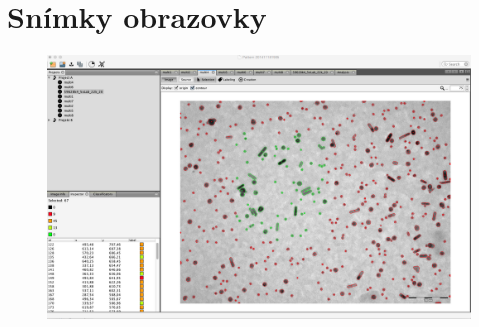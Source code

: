 \documentclass[11pt,twoside,a4paper,table]{book}
\begin{document}
\chapter{Snímky obrazovky}
\label{apend:screens}

\begin{figure}
	\centering
	\includegraphics[scale=1]{figures/app_screen_selection.png}
\end{figure}
\end{document}
